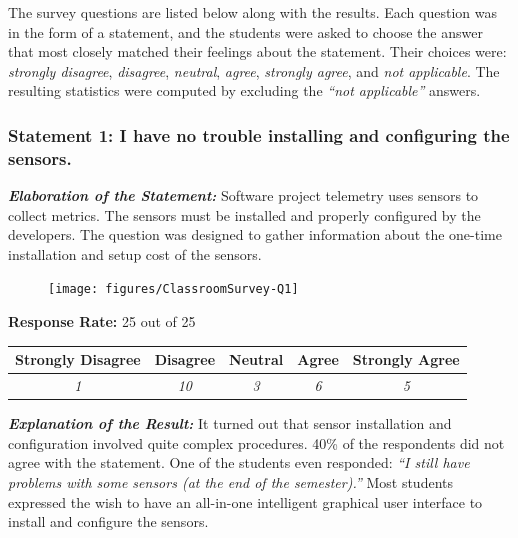 The survey questions are listed below along with the results. Each question was in the form of a statement, and the students were asked to choose the answer that most closely matched their feelings about the statement. Their choices were: \textit{strongly disagree}, \textit{disagree}, \textit{neutral}, \textit{agree}, \textit{strongly agree}, and \textit{not applicable}. The resulting statistics were computed by excluding the \textit{``not applicable''} answers.


\setlength{\parindent}{0mm} %

\clearpage
\subsubsection{Statement 1: I have no trouble installing and configuring the sensors.}

\textbf{\textit{Elaboration of the Statement:}} 
Software project telemetry uses sensors to collect metrics. The sensors must be installed and properly configured by the developers. The question was designed to gather information about the one-time installation and setup cost of the sensors. 

\begin{quote}\end{quote} %

\begin{figure}[h]
  \center
  \texttt{[image: figures/ClassroomSurvey-Q1]}
  \label{fig:InClassSurvey-Q1}
\end{figure}

\begin{center}\textbf{Response Rate:} 25 out of 25\end{center}
\begin{table}[h]
	\centering
		\begin{tabular}{|c|c|c|c|c|} 
			\hline
			\textbf{Strongly Disagree} & \textbf{Disagree} & \textbf{Neutral} & \textbf{Agree} & \textbf{Strongly Agree} \\
			\hline
			\textit{1} & \textit{10} & \textit{3} & \textit{6} &\textit{5} \\
			\hline
		\end{tabular}
	\label{table:InClassSurvey-Q1}
\end{table}

\textbf{\textit{Explanation of the Result:}}
It turned out that sensor installation and configuration involved quite complex procedures. 40\% of the respondents did not agree with the statement. One of the students even responded: \textit{``I still have problems with some sensors (at the end of the semester).''} Most students expressed the wish to have an all-in-one intelligent graphical user interface to install and configure the sensors.

